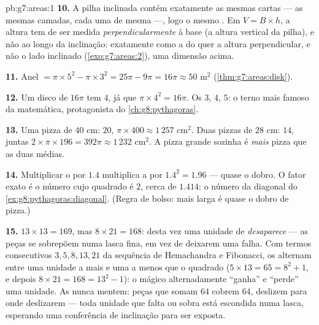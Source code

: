 \begin{solution}{pb:g7:areas:1}
\textbf{10.} A pilha inclinada contém exatamente as mesmas cartas ---
as mesmas camadas, cada uma de mesma  ---, logo o mesmo . Em
$V = B \times h$, a altura tem de ser medida \emph{perpendicularmente}
à base (a altura vertical da pilha), e não ao longo da inclinação:
exatamente como a  do  quer a altura perpendicular, e
não o lado inclinado (\cref{exo:g7:areas:2}), uma dimensão acima.

\textbf{11.} Anel $= \pi \times 5^2 - \pi \times 3^2 = 25\pi - 9\pi =
16\pi \approx 50$ m$^2$ (\cref{thm:g7:areas:disk}).

\textbf{12.} Um disco de  $16\pi$ tem  $4$, já que
$\pi \times 4^2 = 16\pi$. Os  $3$, $4$, $5$: o terno mais famoso
da matemática, protagonista do \cref{ch:g8:pythagoras}.

\textbf{13.} Uma pizza de $40$ cm:  $20$, 
$\pi \times 400 \approx 1\,257$ cm$^2$. Duas pizzas de $28$ cm: 
$14$, juntas $2 \times \pi \times 196 = 392\pi \approx 1\,232$ cm$^2$.
A pizza grande sozinha é \emph{mais} pizza que as duas médias.

\textbf{14.} Multiplicar o  por $1.4$ multiplica a  por
$1.4^2 = 1.96$ --- quase o dobro. O fator exato é o número cujo
quadrado é $2$, cerca de $1.414$: o número da diagonal do
\cref{ex:g8:pythagoras:diagonal}. (Regra de bolso:  mais larga é
quase o dobro de pizza.)

\textbf{15.} $13 \times 13 = 169$, mas $8 \times 21 = 168$: desta vez
uma unidade de  \emph{desaparece} --- as peças se sobrepõem numa
lasca fina, em vez de deixarem uma falha. Com termos consecutivos $3,
5, 8, 13, 21$ da sequência de Hemachandra e Fibonacci, os 
alternam entre uma unidade a mais e uma a menos que o quadrado
($5 \times 13 = 65 = 8^2 + 1$, e depois
$8 \times 21 = 168 = 13^2 - 1$): o mágico alternadamente ``ganha'' e
``perde'' uma unidade. As  nunca mentem: peças que somam $64$
cobrem $64$, deslizem para onde deslizarem --- toda unidade que falta
ou sobra está escondida numa lasca, esperando uma conferência de
inclinação para ser exposta.
\end{solution}
